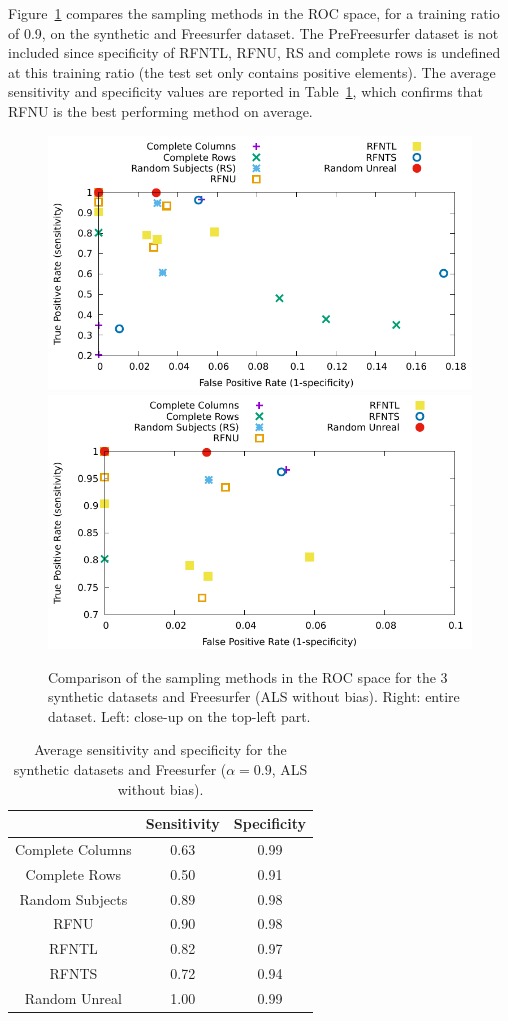 \documentclass[10pt, conference, compsocconf]{IEEEtran}
\begin{document}
Figure~\ref{fig:roc} compares the sampling methods in the ROC space, 
for a training ratio of 0.9, on the synthetic and Freesurfer dataset. 
The PreFreesurfer dataset is not included since specificity of RFNTL, 
RFNU, RS and complete rows is undefined at this training ratio (the 
test set only contains positive elements). The average sensitivity and specificity values 
are reported in Table~\ref{table:roc}, which confirms that RFNU is the best 
performing method on average.
\begin{figure}
\centering
\includegraphics[width=0.5\columnwidth]{data/results/roc/roc.pdf}\hfill
\includegraphics[width=0.5\columnwidth]{data/results/roc/roc-closeup.pdf}
\caption{Comparison of the sampling methods in the ROC space for the 3 synthetic datasets and Freesurfer (ALS without bias). Right: entire dataset. Left: close-up on the top-left part.}
\label{fig:roc}
\end{figure}
\begin{table}
\centering
\begin{tabular}{ccc}
& Sensitivity & Specificity \\
\hline
Complete Columns & 0.63 & 0.99\\
Complete Rows & 0.50 & 0.91\\
Random Subjects & 0.89 & 0.98\\
RFNU & 0.90 & 0.98 \\
RFNTL & 0.82 & 0.97\\
RFNTS & 0.72 & 0.94 \\
Random Unreal & 1.00 & 0.99
\end{tabular}
\caption{Average sensitivity and specificity for the synthetic datasets and Freesurfer ($\alpha=0.9$, ALS without bias).}
\label{table:roc}
\end{table}
\end{document}
